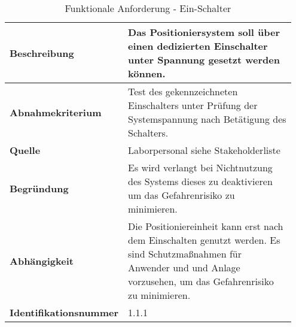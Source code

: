 \documentclass[../Bachelorarbeit.tex]{subfiles}
\begin{document}
\begin{table}[ht]
    \centering
    \begin{tabular}{| p{0.35\linewidth} | p{0.6\linewidth} |}
        \hline
        \textbf{Beschreibung} & Das Positioniersystem soll über einen dedizierten Einschalter unter Spannung gesetzt werden können. \\ \hline
        \textbf{Abnahmekriterium} & Test des gekennzeichneten Einschalters unter Prüfung der Systemspannung nach Betätigung des Schalters. \\ \hline
        \textbf{Quelle} & Laborpersonal siehe Stakeholderliste \\ \hline
        \textbf{Begründung} & Es wird verlangt bei Nichtnutzung des Systems dieses zu deaktivieren um das Gefahrenrisiko zu minimieren. \\ \hline
        \textbf{Abhängigkeit} & Die Positioniereinheit kann erst nach dem Einschalten genutzt werden. Es sind Schutzmaßnahmen für Anwender und und Anlage vorzusehen, um das Gefahrenrisiko zu minimieren. \\ \hline
        \textbf{Identifikationsnummer} & 1.1.1 \\ \hline
    \end{tabular}
    \caption[\acs{fa} - EIN-Schalter]{Funktionale Anforderung - Ein-Schalter}
    \label{tab:my-table}
\end{table}

\end{document}
